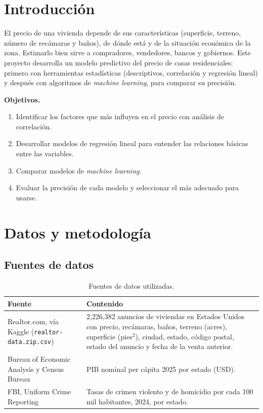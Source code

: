 \documentclass[12pt,letterpaper]{article}
\begin{document}
\section{Introducción}

El precio de una vivienda depende de sus características (superficie, terreno, número de recámaras y baños), de dónde está y de la situación económica de la zona. Estimarlo bien sirve a compradores, vendedores, bancos y gobiernos. Este proyecto desarrolla un modelo predictivo del precio de casas residenciales: primero con herramientas estadísticas (descriptivos, correlación y regresión lineal) y después con algoritmos de \emph{machine learning}, para comparar su precisión.

\textbf{Objetivos.}
\begin{enumerate}[nosep]
  \item Identificar los factores que más influyen en el precio con análisis de correlación.
  \item Desarrollar modelos de regresión lineal para entender las relaciones básicas entre las variables.
  \item Comparar modelos de \emph{machine learning}.
  \item Evaluar la precisión de cada modelo y seleccionar el más adecuado para usarse.
\end{enumerate}

\section{Datos y metodología}

\subsection{Fuentes de datos}

\begin{table}[H]
\centering
\caption{Fuentes de datos utilizadas.}
\small
\begin{tabular}{p{4.2cm}p{10.6cm}}
\toprule
Fuente & Contenido \\
\midrule
Realtor.com, vía Kaggle (\texttt{realtor-data.zip.csv}) & 2,226,382 anuncios de viviendas en Estados Unidos con precio, recámaras, baños, terreno (acres), superficie (pies$^2$), ciudad, estado, código postal, estado del anuncio y fecha de la venta anterior. \\
Bureau of Economic Analysis y Census Bureau & PIB nominal per cápita 2025 por estado (USD). \\
FBI, Uniform Crime Reporting & Tasas de crimen violento y de homicidio por cada 100 mil habitantes, 2024, por estado. \\
\bottomrule
\end{tabular}
\end{table}
\end{document}
